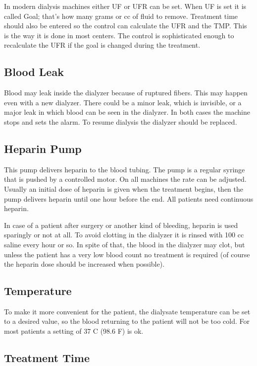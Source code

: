 \documentclass[
  11pt,
  letterpaper,
  DIV=11,
  numbers=noendperiod]{scrreprt}
\begin{document}
In modern dialysis machines either UF or UFR can be set. When UF is set
it is called Goal; that's how many grams or cc of fluid to remove.
Treatment time should also be entered so the control can calculate the
UFR and the TMP. This is the way it is done in most centers. The control
is sophisticated enough to recalculate the UFR if the goal is changed
during the treatment.

\subsection{Blood Leak}\label{blood-leak}

Blood may leak inside the dialyzer because of ruptured fibers. This may
happen even with a new dialyzer. There could be a minor leak, which is
invisible, or a major leak in which blood can be seen in the dialyzer.
In both cases the machine stops and sets the alarm. To resume dialysis
the dialyzer should be replaced.

\subsection{Heparin Pump}\label{heparin-pump}

This pump delivers heparin to the blood tubing. The pump is a regular
syringe that is pushed by a controlled motor. On all machines the rate
can be adjusted. Usually an initial dose of heparin is given when the
treatment begins, then the pump delivers heparin until one hour before
the end. All patients need continuous heparin.

In case of a patient after surgery or another kind of bleeding, heparin
is used sparingly or not at all. To avoid clotting in the dialyzer it is
rinsed with 100 cc saline every hour or so. In spite of that, the blood
in the dialyzer may clot, but unless the patient has a very low blood
count no treatment is required (of course the heparin dose should be
increased when possible).

\subsection{Temperature}\label{temperature}

To make it more convenient for the patient, the dialysate temperature
can be set to a desired value, so the blood returning to the patient
will not be too cold. For most patients a setting of 37 C (98.6 F) is
ok.

\subsection{Treatment Time}\label{treatment-time}
\end{document}
